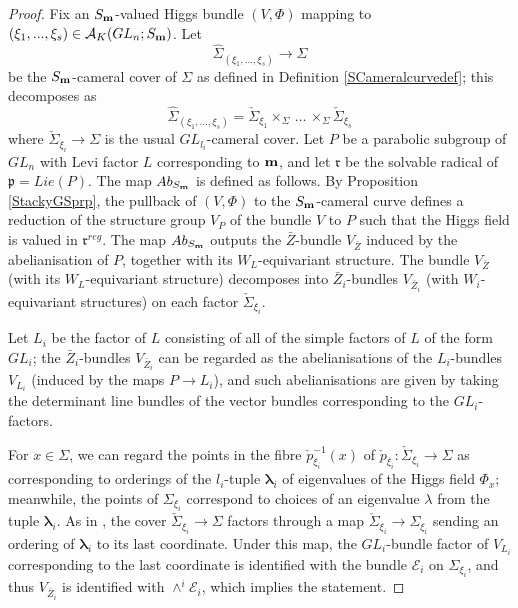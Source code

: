 \documentclass{amsart}
\theoremstyle{remark}
\numberwithin{theorem}{section}
\numberwithin{equation}{section}
\begin{document}
\begin{proof}
Fix an $S_{\bf m}$-valued Higgs bundle $(V,\Phi)$ mapping to $(\xi_1,...,\xi_s)\in \mathcal A_K(GL_n;S_{\bf m})$. Let
$$\hat\Sigma_{(\xi_1,...,\xi_s)} \rightarrow \Sigma$$
be the $S_{\bf m}$-cameral cover of $\Sigma$ as defined in Definition \ref{SCameralcurvedef}; this decomposes as 
\begin{equation}\label{GLnAbHitchin3eqn}
    \hat\Sigma_{(\xi_1,...,\xi_s)}=\check\Sigma_{\xi_1} \times_\Sigma \, ... \, \times_\Sigma \check\Sigma_{\xi_s}
\end{equation}
where $\check\Sigma_{\xi_i} \rightarrow \Sigma$ is the usual $GL_{l_i}$-cameral cover. Let $P$ be a parabolic subgroup of $GL_n$ with Levi factor $L$ corresponding to ${\bf m}$, and let $\mathfrak{r}$ be the solvable radical of $\mathfrak{p}=Lie(P)$. The map $Ab_{S_{\bf m}}$ is defined as follows. By Proposition \ref{StackyGSprp}, the pullback of $(V,\Phi)$ to the $S_{\bf m}$-cameral curve defines a reduction of the structure group $V_P$ of the bundle $V$ to $P$ such that the Higgs field is valued in $\mathfrak{r}^{reg}$. The map $Ab_{S_{\bf m}}$ outputs the $\bar{Z}$-bundle $V_{\bar{Z}}$ induced by the abelianisation of $P$, together with its $W_L$-equivariant structure. The bundle $V_{\bar{Z}}$ (with its $W_L$-equivariant structure) decomposes into $\bar{Z}_i$-bundles $V_{\bar{Z}_i}$ (with $W_i$-equivariant structures) on each factor $\check\Sigma_{\xi_i}$.

Let $L_i$ be the factor of $L$ consisting of all of the simple factors of $L$ of the form $GL_i$; the $\bar{Z}_i$-bundles $V_{\bar{Z}_i}$ can be regarded as the abelianisations of the $L_i$-bundles $V_{L_i}$ (induced by the maps $P \rightarrow L_i$), and such abelianisations are given by taking the determinant line bundles of the vector bundles corresponding to the $GL_i$-factors.

For $x \in \Sigma$, we can regard the points in the fibre $\check{p}_{\xi_i}^{-1}(x)$ of $\check{p}_{\xi_i}:\check\Sigma_{\xi_i}\rightarrow \Sigma$ as corresponding to orderings of the $l_i$-tuple $\boldsymbol{\lambda}_i$ of eigenvalues of the Higgs field $\Phi_x$; meanwhile, the points of ${\Sigma}_{\xi_i}$ correspond to choices of an eigenvalue $\lambda$ from the tuple $\boldsymbol{\lambda}_i$. As in \cite[Section 9]{DG}, the cover $\check\Sigma_{\xi_i} \rightarrow \Sigma$ factors through a map $\check\Sigma_{\xi_i} \rightarrow {\Sigma}_{\xi_i}$ sending an ordering of $\boldsymbol{\lambda}_i$ to its last coordinate. Under this map, the $GL_i$-bundle factor of $V_{L_i}$ corresponding to the last coordinate is identified with the bundle $\mathcal E_i$ on ${\Sigma}_{\xi_i}$, and thus $V_{\bar{Z}_i}$ is identified with $\wedge^i \mathcal E_i$, which implies the statement.
\end{proof}
\end{document}
